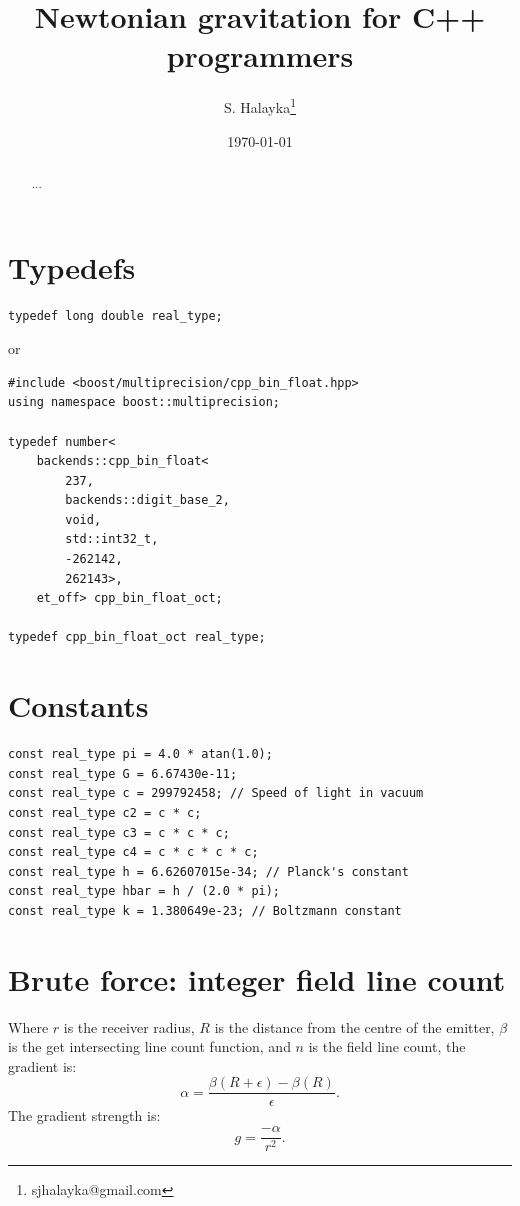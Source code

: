 \documentclass[12pt]{article}
\title{Newtonian gravitation for C++ programmers}
\author{S. Halayka\footnote{sjhalayka@gmail.com}}
\date{\today\;\currenttime}
\begin{document}
 
\maketitle

\begin{abstract}
...
\end{abstract}



\section{Typedefs}

\begin{lstlisting}
typedef long double real_type;
\end{lstlisting}

or

\begin{lstlisting}
#include <boost/multiprecision/cpp_bin_float.hpp>
using namespace boost::multiprecision;

typedef number<
	backends::cpp_bin_float<
		237, 
		backends::digit_base_2, 
		void, 
		std::int32_t, 
		-262142, 
		262143>, 
	et_off> cpp_bin_float_oct;

typedef cpp_bin_float_oct real_type;
\end{lstlisting}





\section{Constants}

\begin{lstlisting}
const real_type pi = 4.0 * atan(1.0);
const real_type G = 6.67430e-11;
const real_type c = 299792458; // Speed of light in vacuum
const real_type c2 = c * c;
const real_type c3 = c * c * c;
const real_type c4 = c * c * c * c;
const real_type h = 6.62607015e-34; // Planck's constant
const real_type hbar = h / (2.0 * pi);
const real_type k = 1.380649e-23; // Boltzmann constant
\end{lstlisting}






\section{Brute force: integer field line count}

Where $r$ is the receiver radius, $R$ is the distance from the centre of the emitter, $\beta$ is the get intersecting line count function, and $n$ is the field line count, the gradient is:
\begin{equation}
\alpha = \frac{\beta(R + \epsilon) - \beta(R)}{\epsilon}.
\end{equation}
The gradient strength is:
\begin{equation}
g = \frac{-\alpha}{r^2}.
\end{equation}
\end{document}
